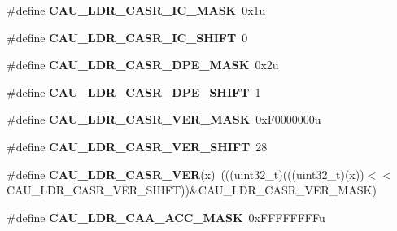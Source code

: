 \begin{DoxyCompactItemize}
\item 
\#define {\bfseries C\+A\+U\+\_\+\+L\+D\+R\+\_\+\+C\+A\+S\+R\+\_\+\+I\+C\+\_\+\+M\+A\+SK}~0x1u\hypertarget{group__CAU__Register__Masks_gae9945a982ee40a35ec7c92d32fd9956a}{}\label{group__CAU__Register__Masks_gae9945a982ee40a35ec7c92d32fd9956a}

\item 
\#define {\bfseries C\+A\+U\+\_\+\+L\+D\+R\+\_\+\+C\+A\+S\+R\+\_\+\+I\+C\+\_\+\+S\+H\+I\+FT}~0\hypertarget{group__CAU__Register__Masks_ga262e6d420bd6efa036c7c6f8a3431c46}{}\label{group__CAU__Register__Masks_ga262e6d420bd6efa036c7c6f8a3431c46}

\item 
\#define {\bfseries C\+A\+U\+\_\+\+L\+D\+R\+\_\+\+C\+A\+S\+R\+\_\+\+D\+P\+E\+\_\+\+M\+A\+SK}~0x2u\hypertarget{group__CAU__Register__Masks_ga591913fd850627ba4dbbe23dff834f4e}{}\label{group__CAU__Register__Masks_ga591913fd850627ba4dbbe23dff834f4e}

\item 
\#define {\bfseries C\+A\+U\+\_\+\+L\+D\+R\+\_\+\+C\+A\+S\+R\+\_\+\+D\+P\+E\+\_\+\+S\+H\+I\+FT}~1\hypertarget{group__CAU__Register__Masks_gab1825cdea4d35d62af51b40a80524a61}{}\label{group__CAU__Register__Masks_gab1825cdea4d35d62af51b40a80524a61}

\item 
\#define {\bfseries C\+A\+U\+\_\+\+L\+D\+R\+\_\+\+C\+A\+S\+R\+\_\+\+V\+E\+R\+\_\+\+M\+A\+SK}~0x\+F0000000u\hypertarget{group__CAU__Register__Masks_gac3ea78b4eacaf7b3cf614dee61564e86}{}\label{group__CAU__Register__Masks_gac3ea78b4eacaf7b3cf614dee61564e86}

\item 
\#define {\bfseries C\+A\+U\+\_\+\+L\+D\+R\+\_\+\+C\+A\+S\+R\+\_\+\+V\+E\+R\+\_\+\+S\+H\+I\+FT}~28\hypertarget{group__CAU__Register__Masks_ga6c0cd608dfa284be126e88595cfef13c}{}\label{group__CAU__Register__Masks_ga6c0cd608dfa284be126e88595cfef13c}

\item 
\#define {\bfseries C\+A\+U\+\_\+\+L\+D\+R\+\_\+\+C\+A\+S\+R\+\_\+\+V\+ER}(x)~(((uint32\+\_\+t)(((uint32\+\_\+t)(x))$<$$<$C\+A\+U\+\_\+\+L\+D\+R\+\_\+\+C\+A\+S\+R\+\_\+\+V\+E\+R\+\_\+\+S\+H\+I\+FT))\&C\+A\+U\+\_\+\+L\+D\+R\+\_\+\+C\+A\+S\+R\+\_\+\+V\+E\+R\+\_\+\+M\+A\+SK)\hypertarget{group__CAU__Register__Masks_gaba538fe03e857a34dab8ed29bcc127f8}{}\label{group__CAU__Register__Masks_gaba538fe03e857a34dab8ed29bcc127f8}

\item 
\#define {\bfseries C\+A\+U\+\_\+\+L\+D\+R\+\_\+\+C\+A\+A\+\_\+\+A\+C\+C\+\_\+\+M\+A\+SK}~0x\+F\+F\+F\+F\+F\+F\+F\+Fu\hypertarget{group__CAU__Register__Masks_ga25d23cb2902598fd7377214fc4c831c4}{}\label{group__CAU__Register__Masks_ga25d23cb2902598fd7377214fc4c831c4}


\end{DoxyCompactItemize}
